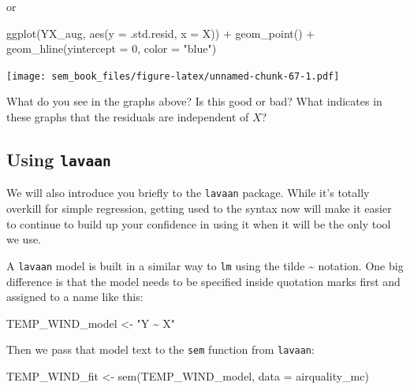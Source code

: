 \documentclass[
]{book}
\newenvironment{Shaded}{\begin{snugshade}}{\end{snugshade}}
\newcommand{\AttributeTok}[1]{\textcolor[rgb]{0.77,0.63,0.00}{#1}}
\newcommand{\DecValTok}[1]{\textcolor[rgb]{0.00,0.00,0.81}{#1}}
\newcommand{\FunctionTok}[1]{\textcolor[rgb]{0.00,0.00,0.00}{#1}}
\newcommand{\NormalTok}[1]{#1}
\newcommand{\OtherTok}[1]{\textcolor[rgb]{0.56,0.35,0.01}{#1}}
\newcommand{\SpecialCharTok}[1]{\textcolor[rgb]{0.00,0.00,0.00}{#1}}
\newcommand{\StringTok}[1]{\textcolor[rgb]{0.31,0.60,0.02}{#1}}
\begin{document}
or

\begin{Shaded}
\begin{Highlighting}[]
\FunctionTok{ggplot}\NormalTok{(YX\_aug, }\FunctionTok{aes}\NormalTok{(}\AttributeTok{y =}\NormalTok{ .std.resid, }\AttributeTok{x =}\NormalTok{ X)) }\SpecialCharTok{+}
    \FunctionTok{geom\_point}\NormalTok{() }\SpecialCharTok{+}
    \FunctionTok{geom\_hline}\NormalTok{(}\AttributeTok{yintercept =} \DecValTok{0}\NormalTok{, }\AttributeTok{color =} \StringTok{"blue"}\NormalTok{)}
\end{Highlighting}
\end{Shaded}

\texttt{[image: sem\_book\_files/figure-latex/unnamed-chunk-67-1.pdf]}

What do you see in the graphs above? Is this good or bad? What indicates in these graphs that the residuals are independent of \(X\)?

\hypertarget{simple-r-lavaan}{%
\subsection{\texorpdfstring{Using \texttt{lavaan}}{Using lavaan}}\label{simple-r-lavaan}}

We will also introduce you briefly to the \texttt{lavaan} package. While it's totally overkill for simple regression, getting used to the syntax now will make it easier to continue to build up your confidence in using it when it will be the only tool we use.

A \texttt{lavaan} model is built in a similar way to \texttt{lm} using the tilde \textasciitilde{} notation. One big difference is that the model needs to be specified inside quotation marks first and assigned to a name like this:

\begin{Shaded}
\begin{Highlighting}[]
\NormalTok{TEMP\_WIND\_model }\OtherTok{\textless{}{-}} \StringTok{"Y \textasciitilde{} X"}
\end{Highlighting}
\end{Shaded}

Then we pass that model text to the \texttt{sem} function from \texttt{lavaan}:

\begin{Shaded}
\begin{Highlighting}[]
\NormalTok{TEMP\_WIND\_fit }\OtherTok{\textless{}{-}} \FunctionTok{sem}\NormalTok{(TEMP\_WIND\_model, }\AttributeTok{data =}\NormalTok{ airquality\_mc)}
\end{Highlighting}
\end{Shaded}
\end{document}
